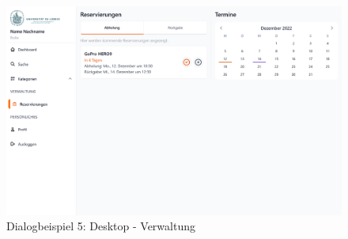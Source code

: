 \begin{figure}[p]
    \centering
    \includegraphics[scale=0.25]{Bilder/Dialgobeispiel/Verwaltung.png}
    \caption{Dialogbeispiel 5: Desktop - Verwaltung}\label{fig:georg}
\end{figure}
